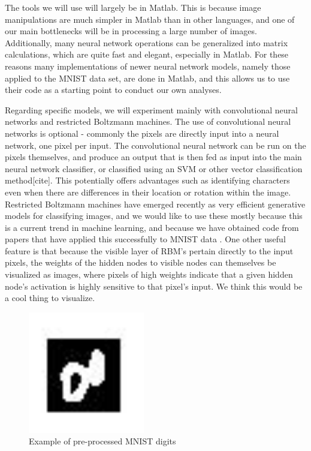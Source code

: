 \documentclass[12pt]{article}  %
\begin{document}
The tools we will use will largely be in Matlab. This is because image manipulations are much simpler in Matlab than in other languages, and one of our main bottlenecks will be in processing a large number of images. Additionally, many neural network operations can be generalized into matrix calculations, which are quite fast and elegant, especially in Matlab. For these reasons many implementations of newer neural network models, namely those applied to the MNIST data set, are done in Matlab, and this allows us to use their code as a starting point to conduct our own analyses. 

Regarding specific models, we will experiment mainly with convolutional neural networks and restricted Boltzmann machines. The use of convolutional neural networks is optional - commonly the pixels are directly input into a neural network, one pixel per input. The convolutional neural network can be run on the pixels themselves, and produce an output that is then fed as input into the main neural network classifier, or classified using an SVM or other vector classification method[cite]. This potentially offers advantages such as identifying characters even when there are differences in their location or rotation within the image. Restricted Boltzmann machines have emerged recently as very efficient generative models for classifying images, and we would like to use these mostly because this is a current trend in machine learning, and because we have obtained code from papers that have applied this successfully to MNIST data \cite{website4}. One other useful feature is that because the visible layer of RBM’s pertain directly to the input pixels, the weights of the hidden nodes to visible nodes can themselves be visualized as images, where pixels of high weights indicate that a given hidden node's activation is highly sensitive to that pixel’s input. We think this would be a cool thing to visualize.  


\begin{figure}[htb]
\label{mnist}
\begin{center}
\includegraphics[width=2in]{MNIST.png}
\caption{Example of pre-processed MNIST digits}
\label{mnist}
\end{center}
\end{figure} 
\end{document}
